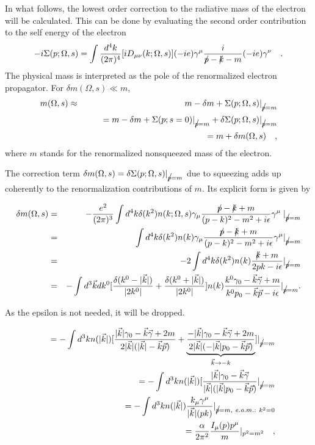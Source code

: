 In what follows, the lowest order correction to the radiative mass of
the electron will be calculated. This can be done by evaluating
the second order contribution to the self energy
of the electron
\begin{equation}
 -i\Sigma (p;\Omega ,s)=\int{d^4k\over (2\pi )^4}[iD_{\mu
\nu}(k;\Omega ,s)](-ie)\gamma^\mu {i\over \rlap{/}p-\rlap{/}k-m}(-ie)\gamma^\nu
 \quad
 .
\end{equation}
The physical mass is interpreted  as the pole of the
renormalized electron propagator. For $\delta m(\Omega ,s)\ll m$,
\begin{eqnarray}
m(\Omega ,s)&\approx &m-\delta m+\Sigma (p;\Omega
 ,s)\vert_{\rlap{/}p=m}\nonumber \\
 & &\qquad =m-\delta m+\Sigma
(p;s=0)\vert_{\rlap{/}p=m}+\delta \Sigma
(p;\Omega,s)\vert_{\rlap{/}p=m}\nonumber \\
 & &\qquad =m+\delta m(\Omega ,s) \quad ,
\end{eqnarray}
where $m$ stands for the renormalized nonsqueezed mass of the electron.

The correction term $\delta m(\Omega ,s) =\delta
\Sigma(p;\Omega ,s)\vert_{\rlap{/}p=m}$
due to squeezing adds up coherently to the renormalization
contributions of $m$. Its explicit form is given by

\begin{eqnarray*}
 \delta m(\Omega ,s)&=&-{e^2\over (2\pi )^3}\int d^4k \delta
 (k^2)n(k;\Omega ,s)\gamma_\mu
 {\rlap{/}p-\rlap{/}k+m\over  (p-k)^2-m^2+i\epsilon }\gamma^\mu
 \mid_{\rlap{/}p=m}  \\
 &=&\int{d^4k}\delta (k^2)n(k)\gamma_{\mu}{\rlap{/}p-\rlap{/}k+m\over (p-k)^2
 -m^2+i\epsilon}\gamma^{\mu}\vert_{\rlap{/}p=m} \\
 &=& -2\int{d^4k}\delta(k^2)n(k){\rlap{/}k+m\over 2pk-i\epsilon}
 \vert_{\rlap{/}p=m}\\
  &=&-\int{d^3\vec k dk^0}[{\delta(k^0-\vert\vec k\vert)\over\vert 2k^0\vert}
 + {\delta(k^0+\vert\vec k\vert)\over\vert 2k^0\vert}]n(k){k^0\gamma_0-
 \vec k \vec\gamma + m\over k^0 p_0-\vec k\vec p-i\epsilon}\vert_{\rlap{/}p=m} .
\end{eqnarray*}

As the epsilon is not needed, it will be dropped.

\begin{eqnarray}
 &&= -\int{d^3k} n(\vert\vec k\vert)[{\vert\vec k\vert\gamma_0-\vec k\vec\gamma
 +2m \over 2 \vert\vec k\vert(\vert\vec k\vert - \vec k\vec p)}+
 \underbrace{{-\vert\vec k\vert\gamma_0-\vec k\vec \gamma + 2m  \over 2 \vert\vec k\vert(-\vert\vec k\vert p_0-\vec k\vec p)}}
 _{\vec k \rightarrow -k}]\vert_{\rlap{/}p=m} \nonumber \\
 &&= -\int {d^3k} n(\vert\vec k\vert)[{\vert\vec k\vert\gamma_0-\vec k\vec\gamma
 \over \vert\vec k\vert(\vert\vec k\vert p_0-\vec k\vec p)}\vert_{\rlap{/}p=m}  \nonumber  \\
 &&= -\int{d^3k} n(\vert\vec k\vert){k_{\mu}\gamma^{\mu}\over\vert\vec k\vert(pk)}
 \vert_{\rlap{/}p=m,\ e.o.m.:\ k^2=0} \nonumber \\
 &&={\alpha \over 2\pi^2}{I_\mu (p)p^\mu \over m}\vert_{p^2=m^2}\quad ,
\end{eqnarray}


